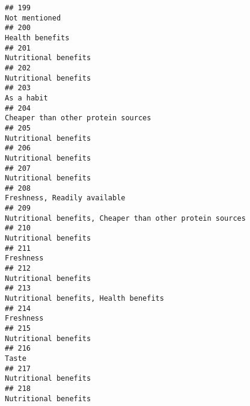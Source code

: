 \documentclass[
]{article}
\begin{document}
\begin{verbatim}
## 199                                                                                                             Not mentioned 
## 200                                                                                                            Health benefits
## 201                                                                                                       Nutritional benefits
## 202                                                                                                       Nutritional benefits
## 203                                                                                                                 As a habit
## 204                                                                                         Cheaper than other protein sources
## 205                                                                                                       Nutritional benefits
## 206                                                                                                       Nutritional benefits
## 207                                                                                                       Nutritional benefits
## 208                                                                                               Freshness, Readily available
## 209                                                                   Nutritional benefits, Cheaper than other protein sources
## 210                                                                                                       Nutritional benefits
## 211                                                                                                                  Freshness
## 212                                                                                                       Nutritional benefits
## 213                                                                                      Nutritional benefits, Health benefits
## 214                                                                                                                  Freshness
## 215                                                                                                       Nutritional benefits
## 216                                                                                                                      Taste
## 217                                                                                                       Nutritional benefits
## 218                                                                                                       Nutritional benefits

\end{verbatim}
\end{document}
